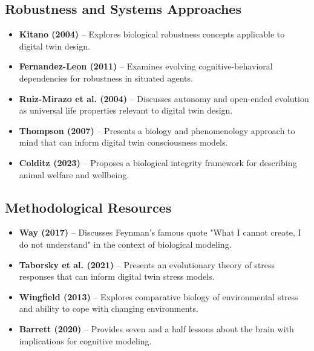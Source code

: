 \documentclass[11pt,a4paper]{article}
\begin{document}
\subsection*{Robustness and Systems Approaches}
\begin{itemize}
    \item \textbf{Kitano (2004)} \cite{kitano2004biological} -- Explores biological robustness concepts applicable to digital twin design.
    
    \item \textbf{Fernandez-Leon (2011)} \cite{fernandez2011evolving} -- Examines evolving cognitive-behavioral dependencies for robustness in situated agents.
    
    \item \textbf{Ruiz-Mirazo et al. (2004)} \cite{ruizmirazo2004universal} -- Discusses autonomy and open-ended evolution as universal life properties relevant to digital twin design.
    
    \item \textbf{Thompson (2007)} \cite{thompson2007mind} -- Presents a biology and phenomenology approach to mind that can inform digital twin consciousness models.
    
    \item \textbf{Colditz (2023)} \cite{colditz2023biological} -- Proposes a biological integrity framework for describing animal welfare and wellbeing.
\end{itemize}

\subsection*{Methodological Resources}
\begin{itemize}
    \item \textbf{Way (2017)} \cite{way2017cannot} -- Discusses Feynman's famous quote "What I cannot create, I do not understand" in the context of biological modeling.
    
    \item \textbf{Taborsky et al. (2021)} \cite{taborsky2021evolutionary} -- Presents an evolutionary theory of stress responses that can inform digital twin stress models.
    
    \item \textbf{Wingfield (2013)} \cite{wingfield2013comparative} -- Explores comparative biology of environmental stress and ability to cope with changing environments.
    
    \item \textbf{Barrett (2020)} \cite{barrett2020seven} -- Provides seven and a half lessons about the brain with implications for cognitive modeling.
\end{itemize}

%
%
\printbibliography
\end{document}
